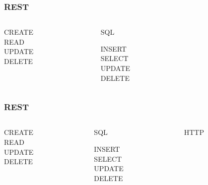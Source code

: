 \begin{frame}
  \frametitle{REST}
  \begin{columns}
    \begin{column}{2cm}
      \begin{center}
      \end{center}
      CREATE\\
      READ\\
      UPDATE\\
      DELETE
    \end{column}    
    \begin{column}{2cm}
      \begin{center}
        SQL
      \end{center}
      INSERT\\
      SELECT\\
      UPDATE\\
      DELETE
    \end{column}
    \begin{column}{2cm}      
    \end{column}
  \end{columns}
\end{frame}

\begin{frame}
  \frametitle{REST}
  \begin{columns}
    \begin{column}{2cm}
      \begin{center}        
      \end{center}
      CREATE\\
      READ\\
      UPDATE\\
      DELETE
    \end{column}    
    \begin{column}{2cm}
      \begin{center}
        SQL
      \end{center}
      INSERT\\
      SELECT\\
      UPDATE\\
      DELETE
    \end{column}
    \begin{column}{2cm}   
      \begin{center}
        HTTP
      \end{center}
      \\
      \\
      \\
    \end{column}
  \end{columns}
\end{frame}

